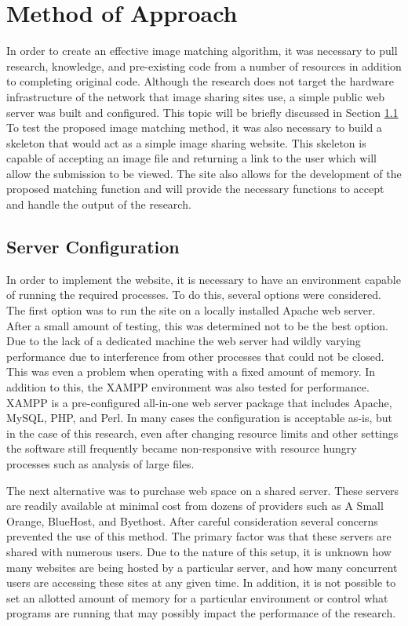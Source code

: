 %
%
%
\chapter{Method of Approach} \label{ch:method}
In order to create an effective image matching algorithm, it was necessary to pull research, knowledge, and pre-existing code from a number of resources in addition to completing original code. Although the research does not target the hardware infrastructure of the network that image sharing sites use, a simple public web server was built and configured. This topic will be briefly discussed in Section \ref{sec:serverconfig} To test the proposed image matching method, it was also necessary to build a skeleton that would act as a simple image sharing website. This skeleton is capable of accepting an image file and returning a link to the user which will allow the submission to be viewed. The site also allows for the development of the proposed matching function and will provide the necessary functions to accept and handle the output of the research.

\section{Server Configuration} \label{sec:serverconfig}
In order to implement the website, it is necessary to have an environment capable of running the required processes. To do this, several options were considered. The first option was to run the site on a locally installed Apache web server. After a small amount of testing, this was determined not to be the best option. Due to the lack of a dedicated machine the web server had wildly varying performance due to interference from other processes that could not be closed. This was even a problem when operating with a fixed amount of memory. In addition to this, the XAMPP environment was also tested for performance. XAMPP is a pre-configured all-in-one web server package that includes Apache, MySQL, PHP, and Perl. In many cases the configuration is acceptable as-is, but in the case of this research, even after changing resource limits and other settings the software still frequently became non-responsive with resource hungry processes such as analysis of large files.

The next alternative was to purchase web space on a shared server. These servers are readily available at minimal cost from dozens of providers such as A Small Orange, BlueHost, and Byethost. After careful consideration several concerns prevented the use of this method. The primary factor was that these servers are shared with numerous users. Due to the nature of this setup, it is unknown how many websites are being hosted by a particular server, and how many concurrent users are accessing these sites at any given time. In addition, it is not possible to set an allotted amount of memory for a particular environment or control what programs are running that may possibly impact the performance of the research.

